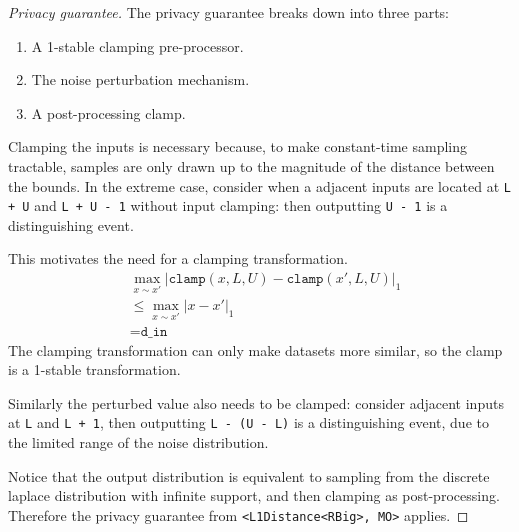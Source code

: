 \documentclass{article}
\begin{document}
\begin{proof}[Privacy guarantee]
    The privacy guarantee breaks down into three parts:
    \begin{enumerate}
        \item A 1-stable clamping pre-processor.
        \item The noise perturbation mechanism.
        \item A post-processing clamp.
    \end{enumerate}

    Clamping the inputs is necessary because, to make constant-time sampling tractable,
    samples are only drawn up to the magnitude of the distance between the bounds.
    In the extreme case, consider when a adjacent inputs are located at \texttt{L + U} and \texttt{L + U - 1} without input clamping:
    then outputting \texttt{U - 1} is a distinguishing event.

    This motivates the need for a clamping transformation.
    \begin{align}
        &\max_{x \sim x'} |\texttt{clamp}(x, L, U) - \texttt{clamp}(x', L, U)|_1 \\ 
        &\leq \max_{x \sim x'} |x - x'|_1 \\
        &= \texttt{d\_in}
    \end{align}
    The clamping transformation can only make datasets more similar,
    so the clamp is a 1-stable transformation.

    Similarly the perturbed value also needs to be clamped:
    consider adjacent inputs at \texttt{L} and \texttt{L + 1},
    then outputting \texttt{L - (U - L)} is a distinguishing event, 
    due to the limited range of the noise distribution.

    Notice that the output distribution is equivalent to sampling from the discrete laplace distribution with infinite support,
    and then clamping as post-processing.
    Therefore the privacy guarantee from \texttt{<L1Distance<RBig>, MO>} applies.
\end{proof}
\end{document}
